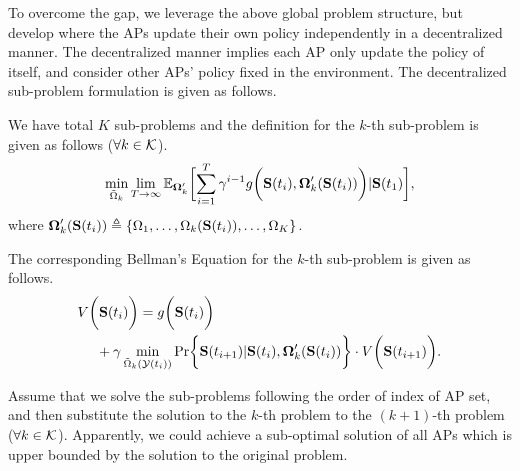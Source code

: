To overcome the gap, we leverage the above global problem structure, but develop  where the APs update their own policy independently in a decentralized manner.
The decentralized manner implies each AP only update the policy of itself, and consider other APs' policy fixed in the environment.
The decentralized sub-problem formulation is given as follows.
\begin{problem}
    We have total $K$ sub-problems and the definition for the $k$-th sub-problem is given as follows ($\forall k\in\mathcal{K}$).
    \begin{align}
        \min_{\tilde{\Omega}_k} \lim_{T \to \infty}
            \mathbb{E}_{\Policy'_{k}}
                \Bracket{\sum_{i=1}^{T} \gamma^{i-1} g\Paren{\Stat(t_{i}), \Policy'_{k}(\Stat(t_{i}))}|\Stat(t_1)},
    \end{align}
    where $\boldsymbol{\Omega}'_{k}(\mathbf{S}(t_{i})) \triangleq \{\Omega_{1}, \dots, \Omega_{k}(\mathbf{S}(t_{i})), \dots, \Omega_{K}\}$.
\end{problem}
The corresponding Bellman's Equation for the $k$-th sub-problem is given as follows.
\begin{align}
    &V\Paren{\Stat(t_{i})} = g\Paren{\Stat(t_{i})}
    \nonumber\\
    &~~~~+ \gamma \min_{\tilde{\Omega}_{k}(\Obsv(t_{i}))} \Pr\Brace{ \Stat(t_{i+1})|\Stat(t_{i}), \Policy'_{k}(\Stat(t_{i})) } \cdot V\Paren{\Stat(t_{i+1})}.
    \label{sp_k}
\end{align}
\begin{remark}
    Assume that we solve the sub-problems following the order of index of AP set, and then substitute the solution to the $k$-th problem to the $(k+1)$-th problem ($\forall k\in\mathcal{K}$).
    Apparently, we could achieve a sub-optimal solution of all APs which is upper bounded by the solution to the original problem.
\end{remark}

